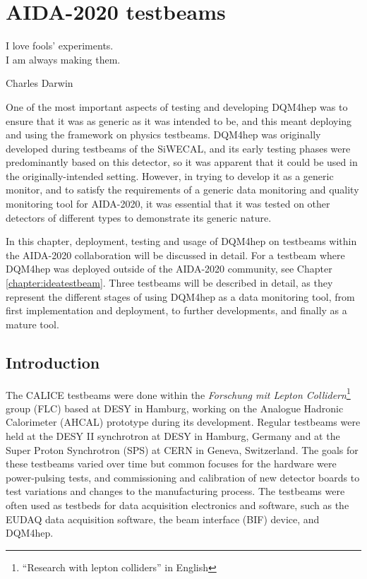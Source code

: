 \chapter{AIDA-2020 testbeams}
\label{chapter:aidatestbeams}
 
\epigraph{I love fools' experiments. \\I am always making them.}{Charles Darwin}

One of the most important aspects of testing and developing DQM4hep was to ensure that it was as generic as it was intended to be, and this meant deploying and using the framework on physics testbeams. DQM4hep was originally developed during testbeams of the SiWECAL, and its early testing phases were predominantly based on this detector, so it was apparent that it could be used in the originally-intended setting. However, in trying to develop it as a generic monitor, and to satisfy the requirements of a generic data monitoring and quality monitoring tool for AIDA-2020, it was essential that it was tested on other detectors of different types to demonstrate its generic nature. 

In this chapter, deployment, testing and usage of DQM4hep on testbeams within the AIDA-2020 collaboration will be discussed in detail. For a testbeam where DQM4hep was deployed outside of the AIDA-2020 community, see Chapter \ref{chapter:ideatestbeam}. Three testbeams will be described in detail, as they represent the different stages of using DQM4hep as a data monitoring tool, from first implementation and deployment, to further developments, and finally as a mature tool.

\section{Introduction}
The CALICE testbeams were done within the \textit{Forschung mit Lepton Collidern}\footnote{``Research with lepton colliders'' in English} group (FLC) based at DESY in Hamburg, working on the Analogue Hadronic Calorimeter (AHCAL) prototype during its development. Regular testbeams were held at the DESY II synchrotron at DESY in Hamburg, Germany and at the Super Proton Synchrotron (SPS) at CERN in Geneva, Switzerland. The goals for these testbeams varied over time but common focuses for the hardware were power-pulsing tests, and commissioning and calibration of new detector boards to test variations and changes to the manufacturing process. The testbeams were often used as testbeds for data acquisition electronics and software, such as the EUDAQ data acquisition software, the beam interface (BIF) device, and DQM4hep.

